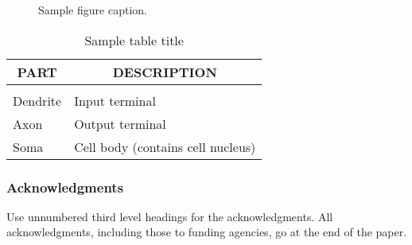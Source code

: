\documentclass{article} %
\begin{document}
\begin{figure}[h]
\begin{center}
\fbox{\rule[-.5cm]{0cm}{4cm} \rule[-.5cm]{4cm}{0cm}}
\end{center}
\caption{Sample figure caption.}
\end{figure}

\begin{table}[t]
\caption{Sample table title}
\label{sample-table}
\begin{center}
\begin{tabular}{ll}
\multicolumn{1}{c}{\bf PART}  &\multicolumn{1}{c}{\bf DESCRIPTION}
\\ \hline \\
Dendrite         &Input terminal \\
Axon             &Output terminal \\
Soma             &Cell body (contains cell nucleus) \\
\end{tabular}
\end{center}
\end{table}



\subsubsection*{Acknowledgments}

Use unnumbered third level headings for the acknowledgments. All
acknowledgments, including those to funding agencies, go at the end of the paper.



\end{document}
